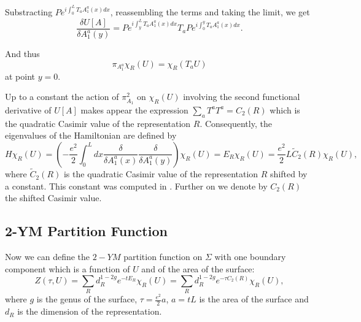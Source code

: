 \documentclass[11pt]{report}
\theoremstyle{plain}
\theoremstyle{definition}
\theoremstyle{remark}
\theoremstyle{remark}
\numberwithin{equation}{section}
\begin{document}
%


Substracting $P e^{i\int_0^L T_aA^a_1(x) dx}$, reassembling the terms and taking the limit, we get
$$ \frac{\delta U[A]}{\delta A^a_1(y)} = P e^{i\int_y^L T_aA^a_1(x) dx} T_a  P e^{i\int_0^y T_aA^a_1(x) dx}.$$ 
%

And thus $$\pi_{A^a_1} \chi_R(U) = \chi_R(T_a U)$$ at point $y=0$.

Up to a constant the action of $\pi_{A_1}^2$ on $\chi_R(U)$ involving the second functional derivative of $U[A]$ makes appear the expression $\sum_a T^aT^a = C_2(R)$ which is the quadratic Casimir value of the representation $R$. 
Consequently, the eigenvalues of the Hamiltonian are defined by
%
$$
H \chi_R(U) = (-\frac{e^2}{2} \int^L_0 dx \frac{\delta}{\delta A^a_1(x)}\frac{\delta}{\delta A^a_1(y)}) \chi_R(U) = E_R \chi_R(U) = \frac{e^2}{2}L\tilde{C}_2(R)\chi_R(U),
$$
where $\tilde{C}_2(R)$ is the quadratic Casimir value of the representation $R$ shifted by a constant. This constant was computed in \cite{Witten2}. Further on we denote by $C_2(R)$ the shifted Casimir value.

\subsection{2-YM Partition Function}


Now we can define the $2-YM$ partition function on $\Sigma$ with one boundary component which is a function of $U$ and of the area of the surface:
%
\begin{equation}\label{Z}
Z(\tau, U) =\sum_R d_R^{1-2g} e^{-tE_R} \chi_R(U) =  \sum_R d_R^{1-2g} e^{-\tau C_2(R)} \chi_R(U),
\end{equation}
where $g$ is the genus of the surface, $\tau = \frac{e^2}{2}a$, $a=tL$ is the area of the surface and $d_R$ is the dimension of the representation.
\end{document}
